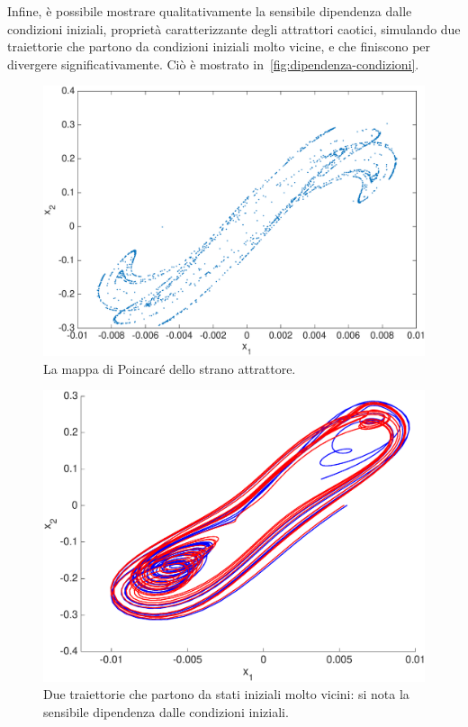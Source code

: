 Infine, è possibile mostrare qualitativamente la sensibile dipendenza dalle condizioni iniziali, proprietà caratterizzante degli attrattori caotici, simulando due traiettorie che partono da condizioni iniziali molto vicine, e che finiscono per divergere significativamente. Ciò è mostrato in~\autoref{fig:dipendenza-condizioni}.

\begin{figure}
    \centering
    \includegraphics[width=\textwidth]{matcont/PoincareCaos}
    \caption{La mappa di Poincaré dello strano attrattore.}
    \label{fig:chaos-poincare}
\end{figure}

\begin{figure}
    \centering
    \includegraphics[width=\textwidth]{matcont/DipendenzaCondizioniIniziali}
    \caption{Due traiettorie che partono da stati iniziali molto vicini: si nota la sensibile dipendenza dalle condizioni iniziali.}
    \label{fig:dipendenza-condizioni}
\end{figure}
